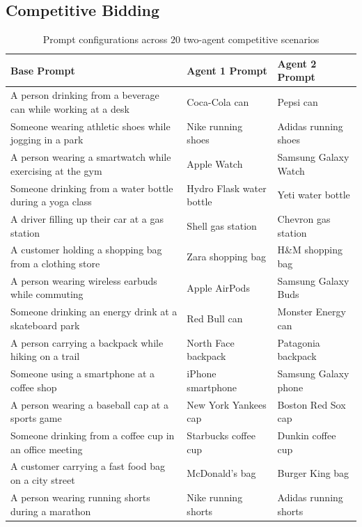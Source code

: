 \documentclass[format=acmsmall, review=false]{acmart}
\begin{document}
\newpage
\subsection{Competitive Bidding}
\label{app:competitive_bidding}
\begin{table}[H]
\caption{Prompt configurations across $20$ two-agent competitive scenarios}
\centering
\footnotesize
\begin{tabular}{>{\raggedright\arraybackslash}p{6cm} 
                >{\raggedright\arraybackslash}p{3cm} 
                >{\raggedright\arraybackslash}p{3cm}}
\toprule
\textbf{Base Prompt} & \textbf{Agent 1 Prompt} & \textbf{Agent 2 Prompt} \\
\midrule
A person drinking from a beverage can while working at a desk & Coca-Cola can & Pepsi can \\ \hline
Someone wearing athletic shoes while jogging in a park & Nike running shoes & Adidas running shoes \\ \hline
A person wearing a smartwatch while exercising at the gym & Apple Watch & Samsung Galaxy Watch \\ \hline
Someone drinking from a water bottle during a yoga class & Hydro Flask water bottle & Yeti water bottle \\ \hline
A driver filling up their car at a gas station & Shell gas station & Chevron gas station \\ \hline
A customer holding a shopping bag from a clothing store & Zara shopping bag & H\&M shopping bag \\ \hline
A person wearing wireless earbuds while commuting & Apple AirPods & Samsung Galaxy Buds \\ \hline
Someone drinking an energy drink at a skateboard park & Red Bull can & Monster Energy can \\ \hline
A person carrying a backpack while hiking on a trail & North Face backpack & Patagonia backpack \\ \hline
Someone using a smartphone at a coffee shop & iPhone smartphone & Samsung Galaxy phone \\ \hline
A person wearing a baseball cap at a sports game & New York Yankees cap & Boston Red Sox cap \\ \hline
Someone drinking from a coffee cup in an office meeting & Starbucks coffee cup & Dunkin coffee cup \\ \hline
A customer carrying a fast food bag on a city street & McDonald's bag & Burger King bag \\ \hline
A person wearing running shorts during a marathon & Nike running shorts & Adidas running shorts \\ \hline

\end{tabular}
\end{table}
\end{document}
